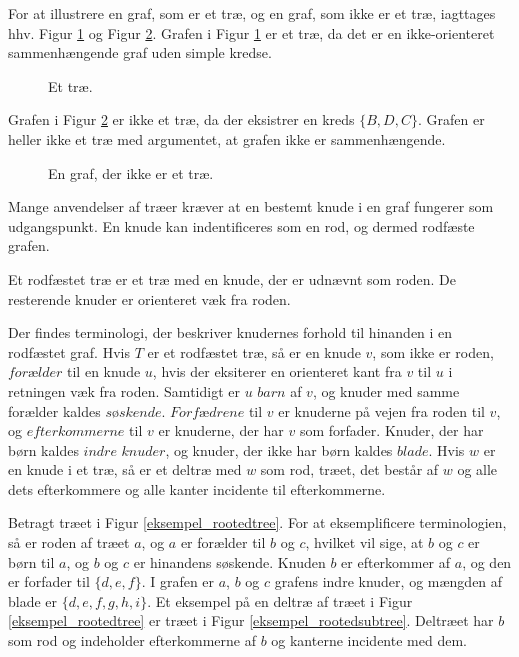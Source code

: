 \begin{exmp}
For at illustrere en graf, som er et træ, og en graf, som ikke er et træ, iagttages hhv. Figur \ref{eksempel_tree} og Figur \ref{eksempel_notree}. Grafen i Figur \ref{eksempel_tree} er et træ, da det er en ikke-orienteret sammenhængende graf uden simple kredse.
\end{exmp}

\begin{figure}[h]
\centering

\caption{Et træ.} 
\label{eksempel_tree}
\end{figure}

Grafen i Figur \ref{eksempel_notree} er ikke et træ, da der eksistrer en kreds $\lbrace B, D, C \rbrace$. Grafen er heller ikke et træ med argumentet, at grafen ikke er sammenhængende.\\

\begin{figure}[h]
\centering

\caption{En graf, der ikke er et træ.} 
\label{eksempel_notree}
\end{figure}

Mange anvendelser af træer kræver at en bestemt knude i en graf fungerer som udgangspunkt. En knude kan indentificeres som en rod, og dermed rodfæste grafen.

\begin{defn}
Et rodfæstet træ er et træ med en knude, der er udnævnt som roden. De resterende knuder er orienteret væk fra roden.
\end{defn}

Der findes terminologi, der beskriver knudernes forhold til hinanden i en rodfæstet graf. 
Hvis $T$ er et rodfæstet træ, så er en knude $v$, som ikke er roden, $\textit{forælder}$ til en knude $u$, hvis der eksiterer en orienteret kant fra $v$ til $u$ i retningen væk fra roden.
Samtidigt er $u$ $\textit{barn}$ af $v$, og knuder med samme forælder kaldes $\textit{søskende}$. 
$\textit{Forfædrene}$ til $v$ er knuderne på vejen fra roden til $v$, og $\textit{efterkommerne}$ til $v$ er knuderne, der har $v$ som forfader. 
Knuder, der har børn kaldes $\textit{indre knuder}$, og knuder, der ikke har børn kaldes $\textit{blade}$.
Hvis $w$ er en knude i et træ, så er et deltræ med $w$ som rod, træet, det består af $w$ og alle dets efterkommere og alle kanter incidente til efterkommerne.

\begin{exmp}
Betragt træet i Figur \ref{eksempel_rootedtree}. 
For at eksemplificere terminologien, så er roden af træet $a$, og $a$ er forælder til $b$ og $c$, hvilket vil sige, at $b$ og $c$ er børn til $a$, og $b$ og $c$ er hinandens søskende. 
Knuden $b$ er efterkommer af $a$, og den er forfader til $\lbrace d, e, f \rbrace$. 
I grafen er $a$, $b$ og $c$ grafens indre knuder, og mængden af blade er $\lbrace d, e, f, g, h, i \rbrace$. 
Et eksempel på en deltræ af træet i Figur \ref{eksempel_rootedtree} er træet i Figur \ref{eksempel_rootedsubtree}.
Deltræet har $b$ som rod og indeholder efterkommerne af $b$ og kanterne incidente med dem. 
\end{exmp}

